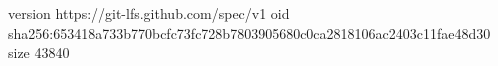 version https://git-lfs.github.com/spec/v1
oid sha256:653418a733b770bcfc73fc728b7803905680c0ca2818106ac2403c11fae48d30
size 43840
